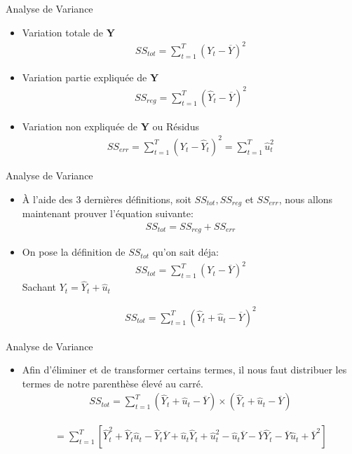 \documentclass{beamer}
\begin{document}
\begin{frame}{Analyse de Variance}
\begin{itemize}
\item Variation totale de \textbf{Y}
\begin{align*}
SS_{tot}=\sum_{t=1}^{T}(Y_t-\overline{Y})^2
\end{align*}
\item Variation partie expliquée de \textbf{Y}
\begin{align*}
SS_{reg}=\sum_{t=1}^{T}(\hat{Y}_t-\overline{Y})^2
\end{align*}
\item Variation non expliquée de \textbf{Y} ou Résidus
\begin{align*}
SS_{err}=\sum_{t=1}^{T}(Y_t-\hat{Y}_t)^2=\sum_{t=1}^{T} \hat{u}_t^2
\end{align*}
\end{itemize}
\end{frame}

\begin{frame}{Analyse de Variance}
\begin{itemize}
\item À l'aide des 3 dernières définitions, soit $SS_{tot}, SS_{reg}$ et $SS_{err}$, nous allons maintenant prouver l'équation suivante:
\begin{align*}
SS_{tot}=SS_{reg}+SS_{err}
\end{align*}
\item On pose la définition de $SS_{tot}$ qu'on sait déja:
\begin{align*}
SS_{tot}=\sum_{t=1}^{T}(Y_t-\overline{Y})^2
\end{align*}
Sachant $Y_t= \hat{Y}_t + \hat{u}_t$

\begin{align*}
SS_{tot}=\sum_{t=1}^{T}(\hat{Y}_t + \hat{u}_t-\overline{Y})^2
\end{align*}
\end{itemize}
\end{frame}


\begin{frame}{Analyse de Variance}
\begin{itemize}
\item Afin d'éliminer et de transformer certains termes, il nous faut distribuer les termes de notre parenthèse élevé au carré.
\begin{align*}
SS_{tot}  =\sum_{t=1}^{T}(\hat{Y}_t + \hat{u}_t-\overline{Y})\times(\hat{Y}_t + \hat{u}_t-\overline{Y})
\end{align*}

\begin{align*}
=\sum_{t=1}^{T} \left[ \hat{Y}_t^2 +\hat{Y}_t\hat{u}_t -\hat{Y}_t\overline{Y} +\hat{u}_t\hat{Y}_t + \hat{u}_t^2-\hat{u}_t \overline{Y}  - \overline{Y} \hat{Y}_t -\overline{Y} \hat{u}_t +\overline{Y}^2 \right]
\end{align*}

\end{itemize}
\end{frame}
\end{document}
